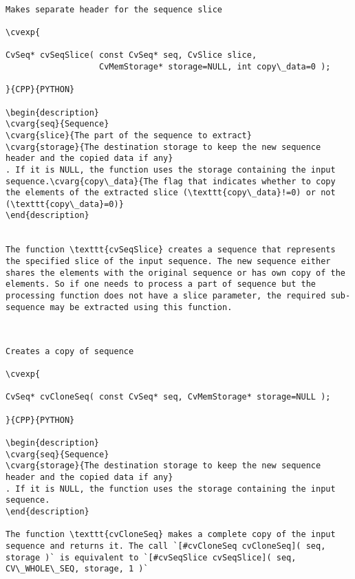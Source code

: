 \label{SeqSlice}
\begin{verbatim}

Makes separate header for the sequence slice

\cvexp{

CvSeq* cvSeqSlice( const CvSeq* seq, CvSlice slice,
                   CvMemStorage* storage=NULL, int copy\_data=0 );

}{CPP}{PYTHON}

\begin{description}
\cvarg{seq}{Sequence}
\cvarg{slice}{The part of the sequence to extract}
\cvarg{storage}{The destination storage to keep the new sequence header and the copied data if any}
. If it is NULL, the function uses the storage containing the input sequence.\cvarg{copy\_data}{The flag that indicates whether to copy the elements of the extracted slice (\texttt{copy\_data}!=0) or not (\texttt{copy\_data}=0)}
\end{description}


The function \texttt{cvSeqSlice} creates a sequence that represents the specified slice of the input sequence. The new sequence either shares the elements with the original sequence or has own copy of the elements. So if one needs to process a part of sequence but the processing function does not have a slice parameter, the required sub-sequence may be extracted using this function.


\end{verbatim}
\label{CloneSeq}
\begin{verbatim}

Creates a copy of sequence

\cvexp{

CvSeq* cvCloneSeq( const CvSeq* seq, CvMemStorage* storage=NULL );

}{CPP}{PYTHON}

\begin{description}
\cvarg{seq}{Sequence}
\cvarg{storage}{The destination storage to keep the new sequence header and the copied data if any}
. If it is NULL, the function uses the storage containing the input sequence.
\end{description}

The function \texttt{cvCloneSeq} makes a complete copy of the input sequence and returns it. The call `[#cvCloneSeq cvCloneSeq]( seq, storage )` is equivalent to `[#cvSeqSlice cvSeqSlice]( seq, CV\_WHOLE\_SEQ, storage, 1 )`


\end{verbatim}
